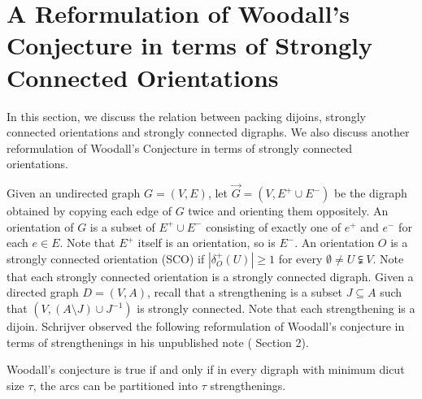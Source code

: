 \documentclass[runningheads]{llncs}
\begin{document}
\section{A Reformulation of Woodall's Conjecture in terms of Strongly Connected Orientations}\label{sec:SCO}
In this section, we discuss the relation between packing dijoins, strongly connected orientations and strongly connected digraphs. We also discuss another reformulation of Woodall's Conjecture in terms of strongly connected orientations.





    Given an undirected graph $G=(V,E)$, let $\vec{G}=(V,E^+\cup E^-)$ be the digraph obtained by copying each edge of $G$ twice and orienting them oppositely. 
    An orientation of $G$ is a subset of $E^+\cup E^-$ consisting of exactly one of $e^+$ and $e^-$ for each $e\in E$. Note that $E^+$ itself is an orientation, so is $E^-$. An orientation $O$ is a strongly connected orientation (SCO) if $|\delta_O^+(U)|\geq 1$ for every $\emptyset \neq U\subsetneqq V$. Note that each strongly connected orientation is a strongly connected digraph.
Given a directed graph $D=(V,A)$, recall that a strengthening is a subset $J\subseteq A$ such that $(V,(A\setminus J)\cup J^{-1})$ is strongly connected. Note that each strengthening is a dijoin. 
Schrijver observed the following reformulation of Woodall's conjecture in terms of strengthenings in his unpublished note (\cite{schrijverobervation} Section 2).
\begin{theorem}\label{thm:eq_strenghthening}
    Woodall's conjecture is true if and only if in every digraph with minimum dicut size $\tau$, the arcs can be partitioned into $\tau$ strengthenings.
\end{theorem} 
\end{document}
